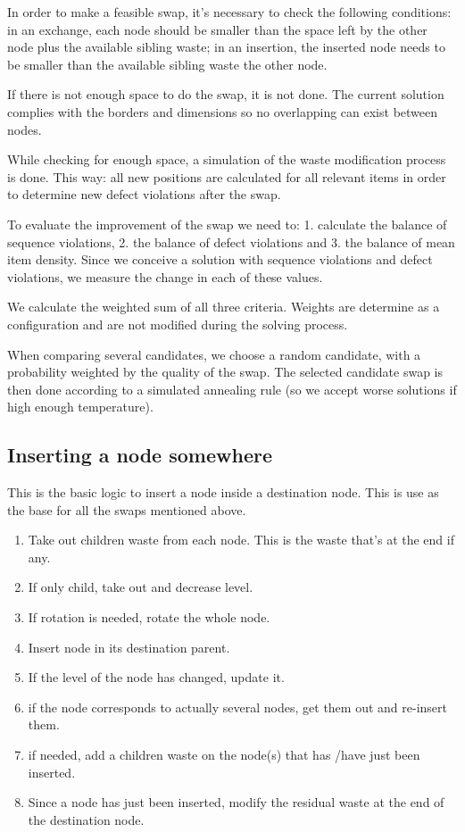 \documentclass{roadef}
\begin{document}
        In order to make a feasible swap, it's necessary to check the following conditions: in an exchange, each node should be smaller than the space left by the other node plus the available sibling waste; in an insertion, the inserted node needs to be smaller than the available sibling waste the other node.

        If there is not enough space to do the swap, it is not done. The current solution complies with the borders and dimensions so no overlapping can exist between nodes.

        While checking for enough space, a simulation of the waste modification process is done. This way: all new positions are calculated for all relevant items in order to determine new defect violations after the swap.

        To evaluate the improvement of the swap we need to: 1. calculate the balance of sequence violations, 2. the balance of defect violations and 3. the balance of mean item density. Since we conceive a solution with sequence violations and defect violations, we measure the change in each of these values.

        We calculate the weighted sum of all three criteria. Weights are determine as a configuration and are not modified during the solving process.

        When comparing several candidates, we choose a random candidate, with a probability weighted by the quality of the swap. The selected candidate swap is then done according to a simulated annealing rule (so we accept worse solutions if high enough temperature).

    \subsection{Inserting a node somewhere}

        This is the basic logic to insert a node inside a destination node. This is use as the base for all the swaps mentioned above.

        \begin{enumerate}

            \item Take out children waste from each node. This is the waste that's at the end if any.
            \item If only child, take out and decrease level.
            \item If rotation is needed, rotate the whole node.
            \item Insert node in its destination parent.
            \item If the level of the node has changed, update it.
            \item if the node corresponds to actually several nodes, get them out and re-insert them.
            \item if needed, add a children waste on the node(s) that has /have just been inserted.
            \item Since a node has just been inserted, modify the residual waste at the end of the destination node.

        \end{enumerate}
\end{document}
